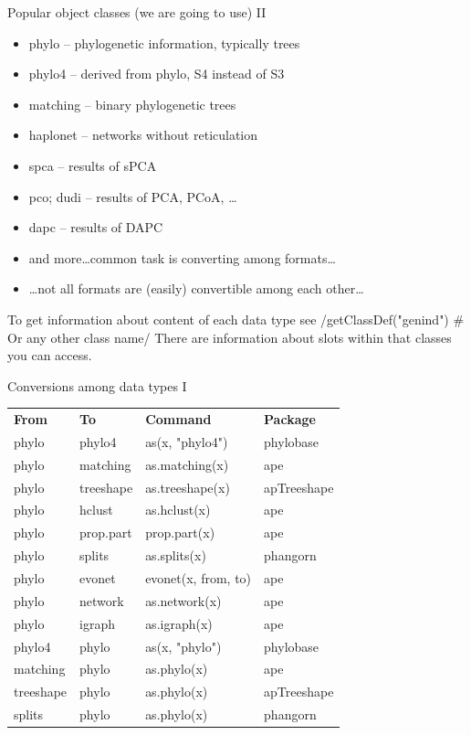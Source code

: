 \documentclass[compress, ucs, xelatex, 11pt, xcolor=svgnames,
  hyperref={
    bookmarks=true,
    unicode=true,
    colorlinks=true,
    pdftitle={Molecular data in R},
    plainpages=false,
    pdfauthor={Vojtech Zeisek},
    pdfsubject={Course about phylogeny and evolution in R},
    pdfcreator={XeLaTeX},
    pdfkeywords={R, evolution, phylogeny, molecular data},
    linkcolor=Tomato,
    anchorcolor=SaddleBrown,
    citecolor=Goldenrod,
    filecolor=DarkMagenta,
    menucolor=Sienna,
    urlcolor=DarkTurquoise,
    pdftex},
  url={hyphens, lowtilde} %
  ]{beamer}
\begin{document}
\begin{frame}[fragile]{Popular object classes (we are going to use) II}
\begin{itemize}
 \item phylo -- phylogenetic information, typically trees
 \item phylo4 -- derived from phylo, S4 instead of S3
 \item matching -- binary phylogenetic trees
 \item haplonet -- networks without reticulation
 \item spca -- results of sPCA
 \item pco; dudi -- results of PCA, PCoA, \ldots
 \item dapc -- results of DAPC
 \item and more\ldots common task is converting among formats\ldots
 \item \ldots not all formats are (easily) convertible among each other\ldots
\end{itemize}
To get information about content of each data type see
\splus/getClassDef("genind") # Or any other class name/
There are information about slots within that classes you can access.
\end{frame}

\begin{frame}{Conversions among data types I}
  \begin{tabular}{llll}
    \textbf{From} & \textbf{To} & \textbf{Command} & \textbf{Package}\\
    phylo & phylo4 & as(x, "phylo4") & phylobase\\
    phylo & matching & as.matching(x) & ape\\
    phylo & treeshape & as.treeshape(x) & apTreeshape\\
    phylo & hclust & as.hclust(x) & ape\\
    phylo & prop.part & prop.part(x) & ape\\
    phylo & splits & as.splits(x) & phangorn\\
    phylo & evonet & evonet(x, from, to) & ape\\
    phylo & network & as.network(x) & ape\\
    phylo & igraph & as.igraph(x) & ape\\
    phylo4 & phylo & as(x, "phylo") & phylobase\\
    matching & phylo & as.phylo(x) & ape\\
    treeshape & phylo & as.phylo(x) & apTreeshape\\
    splits & phylo & as.phylo(x) & phangorn
  \end{tabular}
\end{frame}
\end{document}
